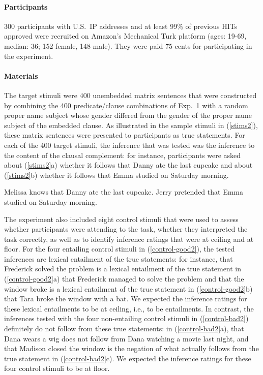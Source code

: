 \documentclass[11pt,fleqn]{article}
\newcommand{\6}{\mbox{$[\hspace*{-.6mm}[$}}
\newcommand{\9}{\mbox{$]\hspace*{-.6mm}]$}}
\begin{document}
\paragraph{Participants} 300 participants with U.S.\ IP addresses and at least 99\% of previous HITs approved were recruited on Amazon's Mechanical Turk platform (ages: 19-69, median: 36; 152 female, 148 male). They were paid 75 cents for participating in the experiment.

\paragraph{Materials} The target stimuli were 400 unembedded matrix sentences that were constructed by combining the 400 predicate/clause combinations of Exp.~1 with a random proper name subject whose gender differed from the gender of the proper name subject of the embedded clause. As illustrated in the sample stimuli in (\ref{stims2}), these matrix sentences were presented to participants as true statements. For each of the 400 target stimuli, the inference that was tested was the inference to the content of the clausal complement: for instance, participants were asked about (\ref{stims2}a) whether it follows that Danny ate the last cupcake and about (\ref{stims2}b) whether it follows that Emma studied on Saturday morning.

\begin{exe}
\ex\label{stims2}
\begin{xlist}
 Melissa knows that Danny ate the last cupcake.
 Jerry pretended that Emma studied on Saturday morning.
\end{xlist}
\end{exe}

The experiment also included eight control stimuli that were used to assess whether participants were attending to the task, whether they interpreted the task correctly, as well as to identify inference ratings that were at ceiling and at floor. For the four entailing control stimuli in (\ref{control-good2}), the tested inferences are lexical entailment of the true statements: for instance, that Frederick solved the problem is a lexical entailment of the true statement in (\ref{control-good2}a) that Frederick managed to solve the problem and that the window broke is a lexical entailment of the true statement in (\ref{control-good2}b) that Tara broke the window with a bat. We expected the inference ratings for these lexical entailments to be at ceiling, i.e., to be entailments. In contrast, the inferences tested with the four non-entailing control stimuli in (\ref{control-bad2}) definitely do not follow from these true statements: in (\ref{control-bad2}a), that Dana wears a wig does not follow from Dana watching a movie last night, and that Madison closed the window is the negation of what actually follows from the true statement in (\ref{control-bad2}c). We expected the inference ratings for these four control stimuli to be at floor.
\end{document}
